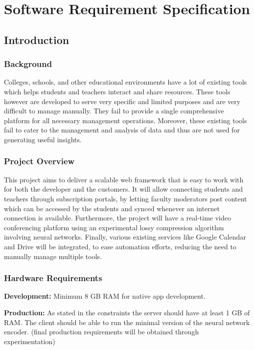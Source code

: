 \chapter{\centering Software Requirement Specification}

\section{Introduction}

\subsection{Background}

Colleges, schools, and other educational environments have a lot of existing tools 
which helps students and teachers interact and share resources.
These tools however are developed to serve very specific and limited purposes and are very difficult to manage manually. They fail to provide a single comprehensive platform for all necessary management operations. Moreover, these existing tools fail to cater to the 
management and analysis of data and thus are not used for generating useful 
insights.

\subsection{Project Overview}

This project aims to deliver a scalable web framework that is easy to work with for both the developer and the customers. It will allow connecting students and 
teachers through subscription portals, by letting faculty moderators post content 
which can be accessed by the students and synced whenever an internet connection 
is available. Furthermore, the project will have a real-time video conferencing platform 
using an experimental lossy compression algorithm involving neural networks. 
Finally, various existing services like Google Calendar and Drive will be integrated, to ease 
automation efforts, reducing the need to manually manage multiple tools.

\subsection{Hardware Requirements}

\textbf{Development:} 
Minimum 8 GB RAM for native app development.

\textbf{Production:} 
As stated in the constraints the server should have at least 1 GB of RAM.
The client should be able to run the minimal version of the neural network encoder.
(final production requirements will be obtained through experimentation)

